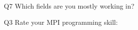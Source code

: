 \begin{description}%
\item{Q7} Which fields are you mostly working in?%
\item{Q3} Rate your MPI programming skill:%
\end{description}%
